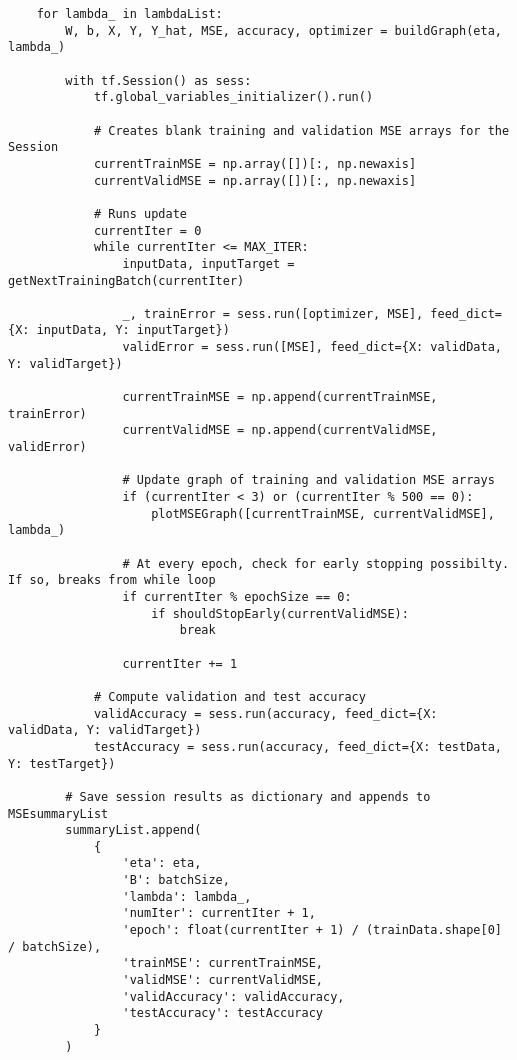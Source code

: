\documentclass[a4paper,12pt]{article}
\begin{document}
\begin{verbatim}
    for lambda_ in lambdaList:
        W, b, X, Y, Y_hat, MSE, accuracy, optimizer = buildGraph(eta, lambda_)

        with tf.Session() as sess:
            tf.global_variables_initializer().run()
            
            # Creates blank training and validation MSE arrays for the Session
            currentTrainMSE = np.array([])[:, np.newaxis]
            currentValidMSE = np.array([])[:, np.newaxis]
            
            # Runs update
            currentIter = 0
            while currentIter <= MAX_ITER:
                inputData, inputTarget = getNextTrainingBatch(currentIter)
                
                _, trainError = sess.run([optimizer, MSE], feed_dict={X: inputData, Y: inputTarget})
                validError = sess.run([MSE], feed_dict={X: validData, Y: validTarget})

                currentTrainMSE = np.append(currentTrainMSE, trainError)
                currentValidMSE = np.append(currentValidMSE, validError)
                
                # Update graph of training and validation MSE arrays
                if (currentIter < 3) or (currentIter % 500 == 0):
                    plotMSEGraph([currentTrainMSE, currentValidMSE], lambda_)
                
                # At every epoch, check for early stopping possibilty. If so, breaks from while loop
                if currentIter % epochSize == 0:
                    if shouldStopEarly(currentValidMSE):
                        break
                
                currentIter += 1
            
            # Compute validation and test accuracy
            validAccuracy = sess.run(accuracy, feed_dict={X: validData, Y: validTarget})
            testAccuracy = sess.run(accuracy, feed_dict={X: testData, Y: testTarget})
            
        # Save session results as dictionary and appends to MSEsummaryList
        summaryList.append(
            {
                'eta': eta,
                'B': batchSize,
                'lambda': lambda_,
                'numIter': currentIter + 1,
                'epoch': float(currentIter + 1) / (trainData.shape[0] / batchSize),
                'trainMSE': currentTrainMSE,
                'validMSE': currentValidMSE,
                'validAccuracy': validAccuracy,
                'testAccuracy': testAccuracy
            }
        )
            

\end{verbatim}
\end{document}
